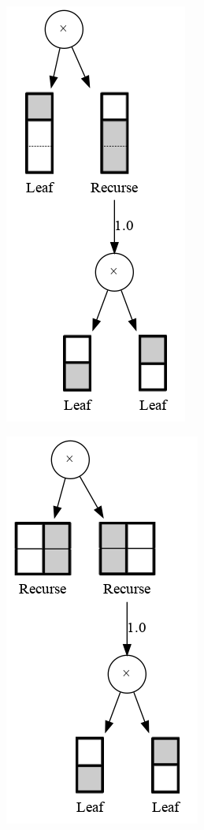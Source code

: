 \documentclass{amsart}
\theoremstyle{plain}
\numberwithin{equation}{section}
\begin{document}
\begin{figure}[h]
  \centering
  \begin{subfigure}[b]{0.3\linewidth}
    \centering\includegraphics[scale=0.3]{graphs/cc1.png}
    \caption{\label{fig:basey-1}}
  \end{subfigure}
  \begin{subfigure}[b]{0.3\linewidth}
    \centering\includegraphics[scale=0.3]{graphs/cc4.png}

\end{subfigure}
\end{figure}
\end{document}
